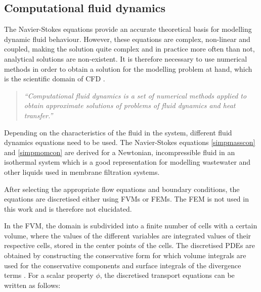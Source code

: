 \subsection{Computational fluid dynamics}
The Navier-Stokes equations provide an accurate theoretical basis for modelling dynamic fluid behaviour. However, these equations are complex, non-linear and coupled, making the solution quite complex and in practice more often than not, analytical solutions are non-existent. It is therefore necessary to use numerical methods in order to obtain a solution for the modelling problem at hand, which is the scientific domain of \gls{CFD} \citep{boekMS}.
\begin{quote}
\textit{``Computational fluid dynamics is a set of numerical methods applied to obtain approximate solutions of problems of fluid dynamics and heat transfer.''}\\
\vspace{-0.75cm}
\end{quote}
Depending on the characteristics of the fluid in the system, different fluid dynamics equations need to be used. The Navier-Stokes equations \eqref{simpmasscon} and \eqref{simpmomcon} are derived for a Newtonian, incompressible fluid in an isothermal system which is a good representation for modelling wastewater and other liquids used in membrane filtration systems. \par %
After selecting the appropriate flow equations and boundary conditions, the equations are discretised either using \glspl{FVM} or \glspl{FEM}. The \gls{FEM} is not used in this work and is therefore not elucidated.\par
In the \gls{FVM}, the domain is subdivided into a finite number of cells with a certain volume, where the values of the different variables are integrated values of their respective cells, stored in the center points of the cells. The discretised \glspl{PDE} are obtained by constructing the conservative form for which volume integrals are used for the conservative components and surface integrals of the divergence terms \citep{boekMS,Patankar1980}. For a scalar property $\phi$, the discretised transport equations can be written as follows:

